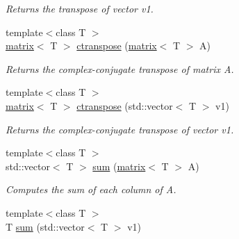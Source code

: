 \begin{DoxyCompactItemize}
\begin{DoxyCompactList}\small\item\em Returns the transpose of vector v1. \end{DoxyCompactList}\item 
\hypertarget{namespacekeycpp_a88081df8038d0b630d6a3540aeca8b9a}{{\footnotesize template$<$class T $>$ }\\\hyperlink{classkeycpp_1_1matrix}{matrix}$<$ T $>$ \hyperlink{namespacekeycpp_a88081df8038d0b630d6a3540aeca8b9a}{ctranspose} (\hyperlink{classkeycpp_1_1matrix}{matrix}$<$ T $>$ A)}\label{namespacekeycpp_a88081df8038d0b630d6a3540aeca8b9a}

\begin{DoxyCompactList}\small\item\em Returns the complex-\/conjugate transpose of matrix A. \end{DoxyCompactList}\item 
\hypertarget{namespacekeycpp_a827218d19d98cf1357032a652a9bf4e5}{{\footnotesize template$<$class T $>$ }\\\hyperlink{classkeycpp_1_1matrix}{matrix}$<$ T $>$ \hyperlink{namespacekeycpp_a827218d19d98cf1357032a652a9bf4e5}{ctranspose} (std\-::vector$<$ T $>$ v1)}\label{namespacekeycpp_a827218d19d98cf1357032a652a9bf4e5}

\begin{DoxyCompactList}\small\item\em Returns the complex-\/conjugate transpose of vector v1. \end{DoxyCompactList}\item 
\hypertarget{namespacekeycpp_a4aedb589e76ced5d79d62c5f72029adb}{{\footnotesize template$<$class T $>$ }\\std\-::vector$<$ T $>$ \hyperlink{namespacekeycpp_a4aedb589e76ced5d79d62c5f72029adb}{sum} (\hyperlink{classkeycpp_1_1matrix}{matrix}$<$ T $>$ A)}\label{namespacekeycpp_a4aedb589e76ced5d79d62c5f72029adb}

\begin{DoxyCompactList}\small\item\em Computes the sum of each column of A. \end{DoxyCompactList}\item 
\hypertarget{namespacekeycpp_ad05b888638b5ea7103bdc6ba0882d47d}{{\footnotesize template$<$class T $>$ }\\T \hyperlink{namespacekeycpp_ad05b888638b5ea7103bdc6ba0882d47d}{sum} (std\-::vector$<$ T $>$ v1)}\label{namespacekeycpp_ad05b888638b5ea7103bdc6ba0882d47d}


\end{DoxyCompactItemize}
